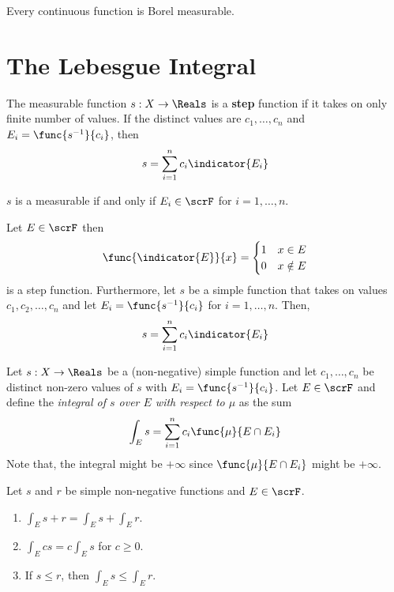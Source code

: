 \begin{theorem}
    Every continuous function is Borel measurable.
\end{theorem}
\section{The Lebesgue Integral}
The measurable function \(s:X \to \Reals\) is a \textbf{step} function if it takes on only finite number of values. If the distinct values are \(c_1, \dots, c_n\) and \(E_i = \func{s^{-1}}{c_i}\), then
\begin{equation*}
    s = \sum_{i = 1}^n c_i \indicator{E_i}
\end{equation*}

\begin{theorem}
    \(s\) is a measurable if and only if \(E_i \in \scrF\) for \(i = 1, \dots, n\).
\end{theorem}

\begin{example}
    Let \(E \in \scrF\) then 
    \begin{equation*}
        \func{\indicator{E}}{x} = \begin{cases}
            1 & x \in E\\
            0 & x \notin E
        \end{cases}
    \end{equation*}
    is a step function. Furthermore, let \(s\) be a simple function that takes on values \(c_1, c_2,\dots, c_n\) and let \(E_i = \func{s^{-1}}{c_i}\) for \(i = 1, \dots, n\). Then, 
    \begin{equation*}
        s = \sum_{i = 1}^n c_i \indicator{E_i}
    \end{equation*}
\end{example}

\begin{definition}
    Let \(s:X\to\Reals\) be a (non-negative) simple function and let \(c_1, \dots,c_n\) be distinct non-zero values of \(s\) with \(E_i = \func{s^{-1}}{c_i}\). Let \(E \in \scrF\) and define the \textit{integral of \(s\) over \(E\) with respect to \(\mu\)} as the sum
    \begin{equation*}
        \int_E s  = \sum_{i = 1}^n c_i \func{\mu}{E \cap E_i}
    \end{equation*}
    Note that, the integral might be \(+\infty\) since \(\func{\mu}{E \cap E_i}\) might be \(+\infty\).
\end{definition}

\begin{proposition}
    Let \(s\) and \(r\) be simple non-negative functions and \(E \in \scrF\).
    \begin{enumerate}
        \item \(\int_E s + r  = \int_E s   + \int_E r \).
        \item \(\int_E c s  = c\int_E s  \) for \(c \geq 0\).
        \item If \(s \leq r\), then \(\int_E s  \leq  \int_E r \).
    \end{enumerate}
\end{proposition}

